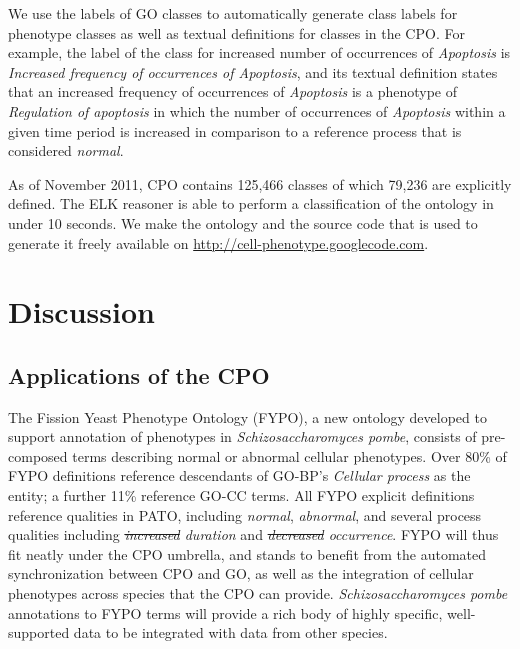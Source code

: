 \documentclass{bioinfo}
\renewcommand{\cite}{\citep}
\providecommand{\DIFadd}[1]{{\protect\color{blue}\uwave{#1}}} %
\providecommand{\DIFdel}[1]{{\protect\color{red}\sout{#1}}}                      %
\providecommand{\DIFaddbegin}{} %
\providecommand{\DIFaddend}{} %
\providecommand{\DIFdelbegin}{} %
\providecommand{\DIFdelend}{} %
\begin{document}
We use the labels of GO classes to automatically generate class labels
for phenotype classes as well as textual definitions for classes in
the CPO. For example, the label of the class for increased number of
occurrences of {\em Apoptosis} is {\em Increased frequency of
  occurrences of Apoptosis}, and its textual definition states that an
increased frequency of occurrences of {\em Apoptosis} is a phenotype
of {\em Regulation of apoptosis} in which the number of occurrences of
{\em Apoptosis} within a given time period is increased in comparison
to a reference process that is considered {\em normal}.

As of November 2011, CPO contains 125,466 classes of which 79,236 are
explicitly defined.  The ELK reasoner \cite{Kazakov2011} is able to
perform a classification of the ontology in under 10 seconds. We make
the ontology and the source code that is used to generate it freely
available on \url{http://cell-phenotype.googlecode.com}.

\section{Discussion}
\subsection{Applications of the CPO}
The Fission Yeast Phenotype Ontology (FYPO), a new ontology developed
to support annotation of phenotypes in {\em Schizosaccharomyces
  pombe}, consists of pre-composed terms describing normal or abnormal
cellular phenotypes. Over 80\% of FYPO definitions reference
descendants of GO-BP's {\em Cellular process} as the entity; a further
11\% reference GO-CC terms. All FYPO explicit definitions reference
qualities in PATO, including {\em normal}, {\em abnormal}, and several
process qualities including {\em \DIFdelbegin \DIFdel{increased }\DIFdelend \DIFaddbegin \DIFadd{Increased }\DIFaddend duration} and {\em
  \DIFdelbegin \DIFdel{decreased }\DIFdelend \DIFaddbegin \DIFadd{Decreased }\DIFaddend occurrence}. FYPO will thus fit neatly under the CPO
umbrella, and stands to benefit from the automated synchronization
between CPO and GO, as well as the integration of cellular phenotypes
across species that the CPO can provide. {\em Schizosaccharomyces
  pombe} annotations to FYPO terms will provide a rich body of highly
specific, well-supported data to be integrated with data from other
species.
\end{document}
